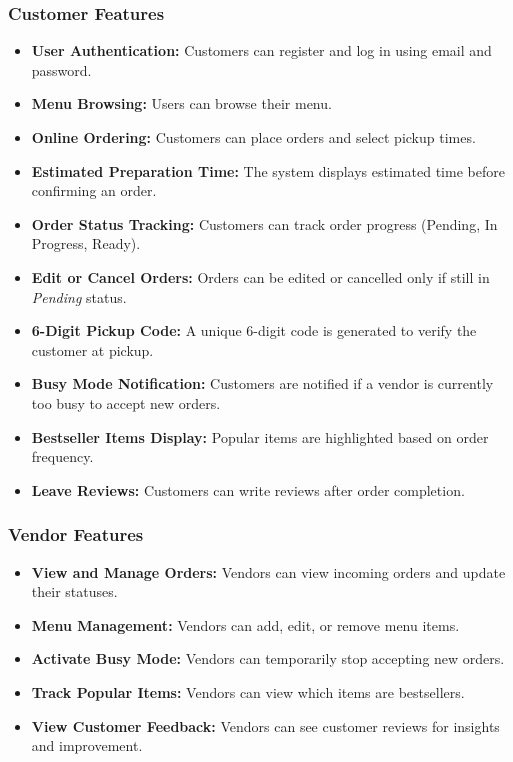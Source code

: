 \documentclass[12pt,a4paper]{article}
\begin{document}
\subsubsection{Customer Features}
\begin{itemize}[leftmargin=2em, itemsep=6pt]
    \item \textbf{User Authentication:} Customers can register and log in using email and password.
    \item \textbf{Menu Browsing:} Users can browse their menu.
    \item \textbf{Online Ordering:} Customers can place orders and select pickup times.
    \item \textbf{Estimated Preparation Time:} The system displays estimated time before confirming an order.
    \item \textbf{Order Status Tracking:} Customers can track order progress (Pending, In Progress, Ready).
    \item \textbf{Edit or Cancel Orders:} Orders can be edited or cancelled only if still in \textit{Pending} status.
    \item \textbf{6-Digit Pickup Code:} A unique 6-digit code is generated to verify the customer at pickup.
    \item \textbf{Busy Mode Notification:} Customers are notified if a vendor is currently too busy to accept new orders.
    \item \textbf{Bestseller Items Display:} Popular items are highlighted based on order frequency.
    \item \textbf{Leave Reviews:} Customers can write reviews after order completion.
\end{itemize}

\subsubsection{Vendor Features}
\begin{itemize}[leftmargin=2em, itemsep=6pt]
    \item \textbf{View and Manage Orders:} Vendors can view incoming orders and update their statuses.
    \item \textbf{Menu Management:} Vendors can add, edit, or remove menu items.
    \item \textbf{Activate Busy Mode:} Vendors can temporarily stop accepting new orders.
    \item \textbf{Track Popular Items:} Vendors can view which items are bestsellers.
    \item \textbf{View Customer Feedback:} Vendors can see customer reviews for insights and improvement.
\end{itemize}
\end{document}
